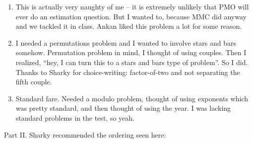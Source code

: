 \documentclass[10pt,paper=letter]{scrartcl}
\begin{document}
\begin{enumerate}
  \item This is actually very naughty of me -- it is extremely unlikely that PMO will ever do an estimation question. But I wanted to, because MMC did anyway and we tackled it in class. Ankan liked this problem a lot for some reason.

  \item I needed a permutations problem and I wanted to involve stars and bars somehow. Permutation problem in mind, I thought of using couples. Then I realized, ``hey, I can turn this to a stars and bars type of problem''. So I did. Thanks to Sharky for choice-writing: factor-of-two and not separating the fifth couple.

  \item Standard fare. Needed a modulo problem, thought of using exponents which was pretty standard, and then thought of using the year. I was lacking standard problems in the test, so yeah.
\end{enumerate}

Part II. Sharky recommended the ordering seen here:
\end{document}
